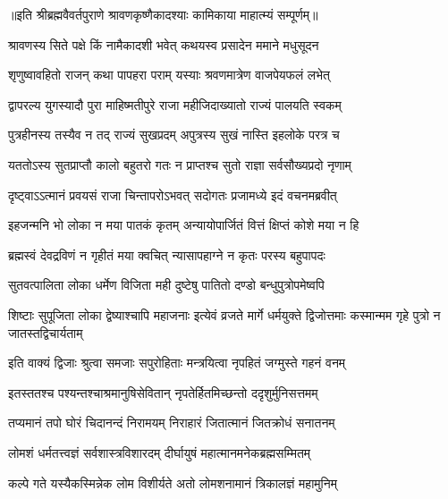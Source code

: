 ॥इति श्रीब्रह्मवैवर्तपुराणे श्रावणकृष्णैकादश्याः कामिकाया माहात्म्यं सम्पूर्णम्॥


\hyperref[sec:ekadashi_mahatmyam_vrata_raja]{\closesub}
\clearpage

\label{sec:vrata-raja-shravana-shukla-putrada}


\twolineshloka
{श्रावणस्य सिते पक्षे किं नामैकादशी भवेत्}
{कथयस्व प्रसादेन ममाने मधुसूदन} %


\twolineshloka
{शृणुष्वावहितो राजन् कथा पापहरा पराम्}
{यस्याः श्रवणमात्रेण वाजपेयफलं लभेत्} %

\twolineshloka
{द्वापरल्य युगस्यादौ पुरा माहिष्मतीपुरे}
{राजा महीजिदाख्यातो राज्यं पालयति स्वकम्} %

\twolineshloka
{पुत्रहीनस्य तस्यैव न तद् राज्यं सुखप्रदम्}
{अपुत्रस्य सुखं नास्ति इहलोके परत्र च} %

\twolineshloka
{यततोऽस्य सुतप्राप्तौ कालो बहुतरो गतः}
{न प्राप्तश्च सुतो राज्ञा सर्वसौख्यप्रदो नृणाम्} %

\twolineshloka
{दृष्ट्वाऽऽत्मानं प्रवयसं राजा चिन्तापरोऽभवत्}
{सदोगतः प्रजामध्ये इदं वचनमब्रवीत्} %

\twolineshloka
{इहजन्मनि भो लोका न मया पातकं कृतम्}
{अन्यायोपार्जितं वित्तं क्षिप्तं कोशे मया न हि} %

\twolineshloka
{ब्रह्मस्वं देवद्रविणं न गृहीतं मया क्वचित्}
{न्यासापहाग्ने न कृतः परस्य बहुपापदः} %

\twolineshloka
{सुतवत्पालिता लोका धर्मेण विजिता मही}
{दुष्टेषु पातितो दण्डो बन्धुपुत्रोपमेष्वपि} %


\threelineshloka
{शिष्टाः सुपूजिता लोका द्वेष्याश्चापि महाजनाः}
{इत्येवं व्रजते मार्गे धर्मयुक्ते द्विजोत्तमाः}
{कस्मान्मम गृहे पुत्रो न जातस्तद्विचार्यताम्} %

\twolineshloka
{इति वाक्यं द्विजाः श्रुत्वा समजाः सपुरोहिताः}
{मन्त्रयित्वा नृपहितं जग्मुस्ते गहनं वनम्} %

\twolineshloka
{इतस्ततश्च पश्यन्तश्चाश्रमानुषिसेवितान्}
{नृपतेर्हितमिच्छन्तो ददृशुर्मुनिसत्तमम्} %

\twolineshloka
{तप्यमानं तपो घोरं चिदानन्दं निरामयम्}
{निराहारं जितात्मानं जितक्रोधं सनातनम्} %

\twolineshloka
{लोमशं धर्मतत्त्वज्ञं सर्वशास्त्रविशारदम्}
{दीर्घायुषं महात्मानमनेकब्रह्मसम्मितम्} %

\twolineshloka
{कल्पे गते यस्यैकस्मिन्नेक लोम विशीर्यते}
{अतो लोमशनामानं त्रिकालज्ञं महामुनिम्} %

